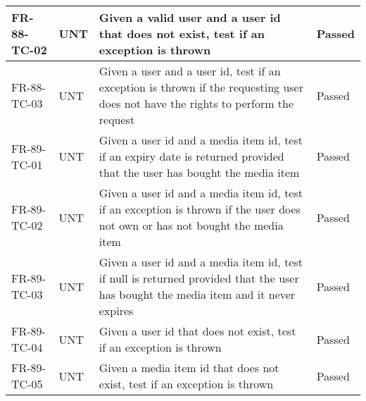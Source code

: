 \documentclass[../report.tex]{subfiles}
\begin{document}
\begin{longtable}{|L{2.1cm}|L{1cm}|L{12.4cm}|L{1.4cm}|}
FR-88-TC-02&UNT&Given a valid user and a user id that does not exist, test if an exception is thrown&Passed  \\ \hline
FR-88-TC-03&UNT&Given a user and a user id, test if an exception is thrown if the requesting user does not have the rights to perform the request&Passed  \\ \hline
FR-89-TC-01&UNT&Given a user id and a media item id, test if an expiry date is returned provided that the user has bought the media item&Passed  \\ \hline
FR-89-TC-02&UNT&Given a user id and a media item id, test if an exception is thrown if the user does not own or has not bought the media item&Passed  \\ \hline
FR-89-TC-03&UNT&Given a user id and a media item id, test if null is returned provided that the user has bought the media item and it never expires&Passed  \\ \hline
FR-89-TC-04&UNT&Given a user id that does not exist, test if an exception is thrown&Passed  \\ \hline
FR-89-TC-05&UNT&Given a media item id that does not exist, test if an exception is thrown&Passed  \\ \hline
\end{longtable}
\end{document}
